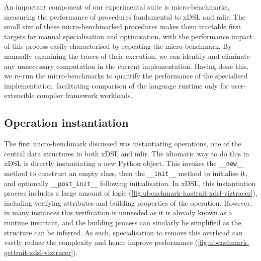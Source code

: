 An important component of our experimental suite is micro-benchmarks, measuring the performance of procedures fundamental to xDSL and \ac{mlir}.
The small size of these micro-benchmarked procedures makes them tractable first targets for manual specialisation and optimisation, with the performance impact of this process easily characterised by repeating the micro-benchmark.
By manually examining the traces of their execution, we can identify and eliminate any unnecessary computation in the current implementation.
Having done this, we re-run the micro-benchmarks to quantify the performance of the specialised implementation, facilitating comparison of the language runtime only for user-extensible compiler framework workloads.


\subsection{Operation instantiation}
\label{sec:specialising-ubenchmarks-instantiation}

The first micro-benchmark discussed was instantiating operations, one of the central data structures in both xDSL and \ac{mlir}.
The idiomatic way to do this in xDSL is directly instantiating a new Python object.
This invokes the \texttt{__new__} method to construct an empty class, then the \texttt{__init__} method to initialise it, and optionally \texttt{__post_init__} following initialisation.
In xDSL, this instantiation process includes a large amount of logic (\autoref{fig:ubenchmark-hastrait-xdsl-viztracer}), including verifying attributes and building properties of the operation.
However, in many instances this verification is unneeded as it is already known as a runtime invariant, and the building process can similarly be simplified as the structure can be inferred.
As such, specialisation to remove this overhead can vastly reduce the complexity and hence improve performance (\autoref{fig:ubenchmark-gettrait-xdsl-viztracer}).

